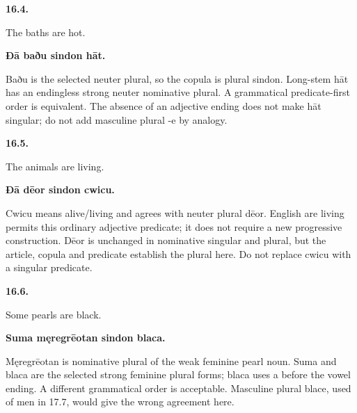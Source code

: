 \par\begin{minipage}{\linewidth}\raggedright
\textbf{16.4.}

The baths are hot.

\textbf{Ðā baðu sindon hāt.}

Baðu is the selected neuter plural, so the copula is plural sindon. Long-stem hāt has an endingless strong neuter nominative plural. A grammatical predicate-first order is equivalent. The absence of an adjective ending does not make hāt singular; do not add masculine plural -e by analogy.

\end{minipage}\par\addvspace{4pt}

\par\begin{minipage}{\linewidth}\raggedright
\textbf{16.5.}

The animals are living.

\textbf{Ðā dēor sindon cwicu.}

Cwicu means alive/\allowbreak{}living and agrees with neuter plural dēor. English are living permits this ordinary adjective predicate; it does not require a new progressive construction. Dēor is unchanged in nominative singular and plural, but the article, copula and predicate establish the plural here. Do not replace cwicu with a singular predicate.

\end{minipage}\par\addvspace{4pt}

\par\begin{minipage}{\linewidth}\raggedright
\textbf{16.6.}

Some pearls are black.

\textbf{Suma męregrēotan sindon blaca.}

Męregrēotan is nominative plural of the weak feminine pearl noun. Suma and blaca are the selected strong feminine plural forms; blaca uses a before the vowel ending. A different grammatical order is acceptable. Masculine plural blace, used of men in 17.7, would give the wrong agreement here.

\end{minipage}\par\addvspace{4pt}

